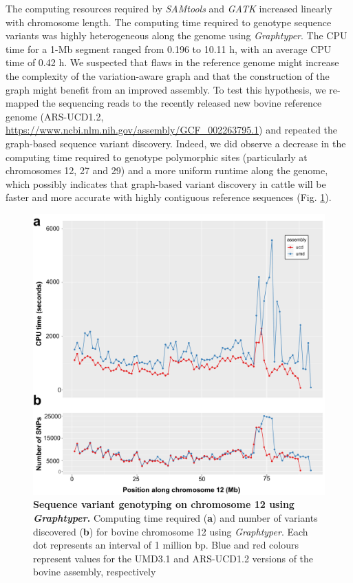\documentclass[../main.tex]{subfiles}
\begin{document}
The computing resources required by \emph{SAMtools} and \emph{GATK} increased linearly with chromosome length. 
The computing time required to genotype sequence variants was highly heterogeneous along the genome using \emph{Graphtyper}. 
The CPU time for a 1-Mb segment ranged from 0.196 to 10.11 h, with an average CPU time of 0.42 h. 
We suspected that flaws in the reference genome might increase the complexity of the variation-aware graph and that the construction of the graph might benefit from an improved assembly. 
To test this hypothesis, we re-mapped the sequencing reads to the recently released new bovine reference genome (ARS-UCD1.2, \url{https://www.ncbi.nlm.nih.gov/assembly/GCF_002263795.1}) and repeated the graph-based sequence variant discovery. 
Indeed, we did observe a decrease in the computing time required to genotype polymorphic sites (particularly at chromosomes 12, 27 and 29) and a more uniform runtime along the genome, which possibly indicates that graph-based variant discovery in cattle will be faster and more accurate with highly contiguous reference sequences (Fig. \ref{fig:varassemb}).


\begin{figure}[!htb]
    \centering
    \includegraphics[width=\textwidth]{paper1/main_figure/Figure5.pdf}
    \caption[Sequence variant genotyping on chromosome 12 using \emph{Graphtyper}]{\textbf{Sequence variant genotyping on chromosome 12 using \emph{Graphtyper}.} Computing time required (\textbf{a}) and number of variants discovered (\textbf{b}) for bovine chromosome 12 using \emph{Graphtyper}. 
    Each dot represents an interval of 1 million bp. Blue and red colours represent values for the UMD3.1 and ARS-UCD1.2 versions of the bovine assembly, respectively}
    \label{fig:varassemb}
\end{figure}
\end{document}
